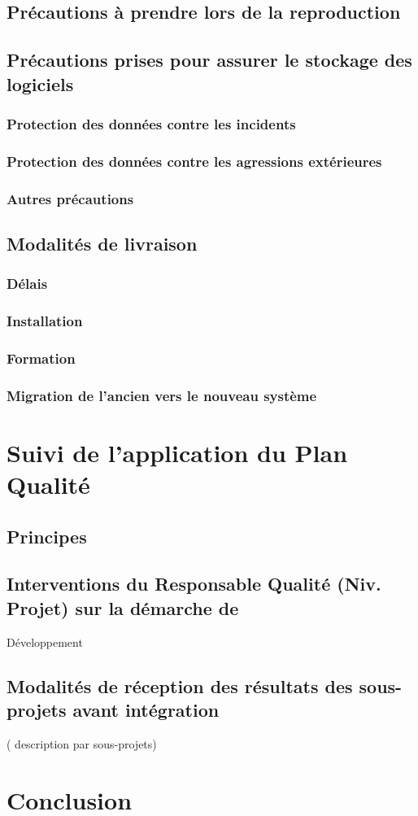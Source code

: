 \documentclass[a4paper]{article}
\begin{document}
\subsection{Précautions à prendre lors de la reproduction}
\subsection{Précautions prises pour assurer le stockage des logiciels}
\subsubsection{Protection des données contre les incidents}
\subsubsection{Protection des données contre les agressions extérieures}
\subsubsection{Autres précautions}
\subsection{Modalités de livraison}
\subsubsection{Délais}
\subsubsection{Installation}
\subsubsection{Formation}
\subsubsection{Migration de l'ancien vers le nouveau système}

\section{Suivi de l'application du Plan Qualité}
\subsection{Principes}
\subsection{Interventions du Responsable Qualité (Niv. Projet) sur la démarche de }
                    Développement
\subsection{Modalités de réception des résultats des sous-projets avant intégration}
        ( description par sous-projets)

\section{Conclusion}
\end{document}
